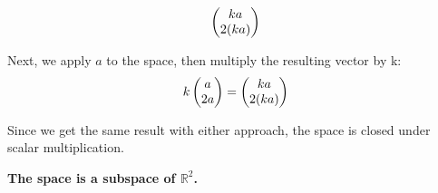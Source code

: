 \documentclass{article}
\begin{document}
{{	\[
	\left(\begin{array}{@{}c@{}}
		ka \\
		2(ka) \\ 
	\end{array}\right)
	\]
	\par\noindent Next, we apply \(a\) to the space, then multiply the resulting vector by k:
	\[
	k	\left(\begin{array}{@{}c@{}}
		a \\
		2a \\ 
	\end{array}\right) = 
	\left(\begin{array}{@{}c@{}}
	ka \\
	2(ka) \\ 
\end{array}\right)
	\]
	\par\noindent Since we get the same result with either approach, the space is closed under scalar multiplication.
	\newline
	\par\noindent \textbf{The space is a subspace of \(\mathbb{R}^2\).}
}
}
\newline
\newline
\newline
{}
\newline
\newline
\newline
\end{document}
